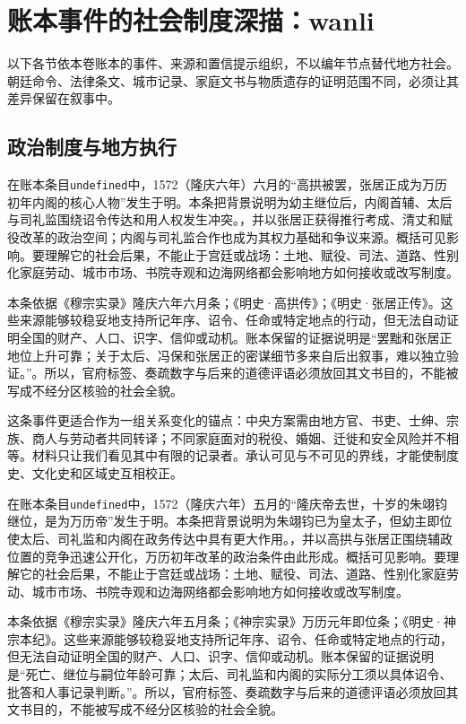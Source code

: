 \section{账本事件的社会制度深描：wanli}

\label{sec:ledger-depth-wanli}

以下各节依本卷账本的事件、来源和置信提示组织，不以编年节点替代地方社会。朝廷命令、法律条文、城市记录、家庭文书与物质遗存的证明范围不同，必须让其差异保留在叙事中。

\subsection{政治制度与地方执行}

在账本条目\texttt{undefined}中，1572（隆庆六年）六月的“高拱被罢，张居正成为万历初年内阁的核心人物”发生于明。本条把背景说明为幼主继位后，内阁首辅、太后与司礼监围绕诏令传达和用人权发生冲突。，并以张居正获得推行考成、清丈和赋役改革的政治空间；内阁与司礼监合作也成为其权力基础和争议来源。概括可见影响。要理解它的社会后果，不能止于宫廷或战场：土地、赋役、司法、道路、性别化家庭劳动、城市市场、书院寺观和边海网络都会影响地方如何接收或改写制度。

本条依据《穆宗实录》隆庆六年六月条；《明史·高拱传》；《明史·张居正传》。这些来源能够较稳妥地支持所记年序、诏令、任命或特定地点的行动，但无法自动证明全国的财产、人口、识字、信仰或动机。账本保留的证据说明是“罢黜和张居正地位上升可靠；关于太后、冯保和张居正的密谋细节多来自后出叙事，难以独立验证。”。所以，官府标签、奏疏数字与后来的道德评语必须放回其文书目的，不能被写成不经分区核验的社会全貌。

这条事件更适合作为一组关系变化的锚点：中央方案需由地方官、书吏、士绅、宗族、商人与劳动者共同转译；不同家庭面对的税役、婚姻、迁徙和安全风险并不相等。材料只让我们看见其中有限的记录者。承认可见与不可见的界线，才能使制度史、文化史和区域史互相校正。

在账本条目\texttt{undefined}中，1572（隆庆六年）五月的“隆庆帝去世，十岁的朱翊钧继位，是为万历帝”发生于明。本条把背景说明为朱翊钧已为皇太子，但幼主即位使太后、司礼监和内阁在政务传达中具有更大作用。，并以高拱与张居正围绕辅政位置的竞争迅速公开化，万历初年改革的政治条件由此形成。概括可见影响。要理解它的社会后果，不能止于宫廷或战场：土地、赋役、司法、道路、性别化家庭劳动、城市市场、书院寺观和边海网络都会影响地方如何接收或改写制度。

本条依据《穆宗实录》隆庆六年五月条；《神宗实录》万历元年即位条；《明史·神宗本纪》。这些来源能够较稳妥地支持所记年序、诏令、任命或特定地点的行动，但无法自动证明全国的财产、人口、识字、信仰或动机。账本保留的证据说明是“死亡、继位与嗣位年龄可靠；太后、司礼监和内阁的实际分工须以具体诏令、批答和人事记录判断。”。所以，官府标签、奏疏数字与后来的道德评语必须放回其文书目的，不能被写成不经分区核验的社会全貌。

